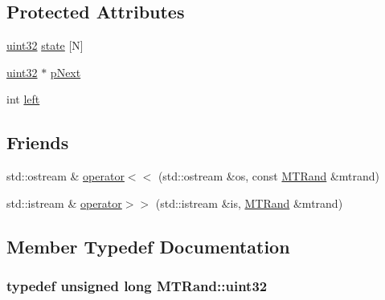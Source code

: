 \subsection*{Protected Attributes}
\begin{DoxyCompactItemize}
\item 
\hyperlink{classMTRand_a45478edf9e24dcd2a5164bac3889d6a2}{uint32} \hyperlink{classMTRand_a2c87f537429bf0b0f6a452c22b9eebba}{state} \mbox{[}N\mbox{]}
\item 
\hyperlink{classMTRand_a45478edf9e24dcd2a5164bac3889d6a2}{uint32} $\ast$ \hyperlink{classMTRand_a2b80858137c88fe69d4d2bdc665bcf93}{pNext}
\item 
int \hyperlink{classMTRand_a98eabf568c88f121e44f487397f32495}{left}
\end{DoxyCompactItemize}
\subsection*{Friends}
\begin{DoxyCompactItemize}
\item 
std::ostream \& \hyperlink{classMTRand_a059061d50a1e54ee3067d4e1dbdd7c64}{operator$<$$<$} (std::ostream \&os, const \hyperlink{classMTRand}{MTRand} \&mtrand)
\item 
std::istream \& \hyperlink{classMTRand_a45b02a702835a3be42171c5c2dc79b2d}{operator$>$$>$} (std::istream \&is, \hyperlink{classMTRand}{MTRand} \&mtrand)
\end{DoxyCompactItemize}


\subsection{Member Typedef Documentation}
\hypertarget{classMTRand_a45478edf9e24dcd2a5164bac3889d6a2}{
\subsubsection[{uint32}]{\setlength{\rightskip}{0pt plus 5cm}typedef unsigned long {\bf MTRand::uint32}}}
\label{classMTRand_a45478edf9e24dcd2a5164bac3889d6a2}


